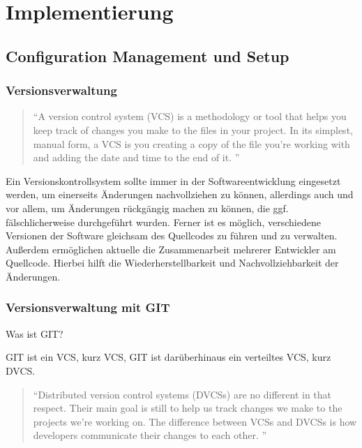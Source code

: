 \chapter{Implementierung} \label{kap:implementierung}

\section{Configuration Management und Setup}

\subsection{Versionsverwaltung}
\begin{quotation}
\enquote{A version control system (VCS) is a methodology or tool that helps you keep track of changes you make to the files in your project. In its simplest, manual form, a VCS is you creating a copy of the file you’re working with and adding the date and time to the end of it. \citep[S. 15][]{pragGit}}
\end{quotation}

Ein Versionskontrollsystem sollte immer in der Softwareentwicklung eingesetzt werden, um einerseits Änderungen nachvollziehen zu können, allerdings auch und vor allem, um Änderungen rückgängig machen zu können, die ggf. fälschlicherweise durchgeführt wurden. Ferner ist es möglich, verschiedene Versionen der Software gleichsam des Quellcodes zu führen und zu verwalten. Außerdem ermöglichen aktuelle  die Zusammenarbeit mehrerer Entwickler am Quellcode. Hierbei hilft die Wiederherstellbarkeit und Nachvollziehbarkeit der Änderungen. 

\subsection{Versionsverwaltung mit GIT}

Was ist GIT?

GIT ist ein \gls{VCS}, kurz VCS, GIT ist darüberhinaus ein verteiltes \gls{VCS}, kurz DVCS.

\begin{quotation}
\enquote{Distributed version control systems (DVCSs) are no different in that respect. Their main goal is still to help us track changes we make to the projects we’re working on. The difference between VCSs and DVCSs is how developers communicate their changes to each other. \citep[S. 15][]{pragGit}}
\end{quotation}

